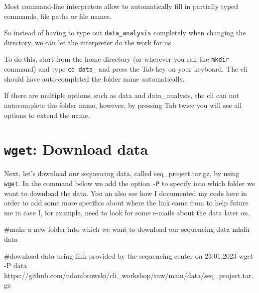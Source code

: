 \documentclass[
  letterpaper,
  DIV=11,
  numbers=noendperiod]{scrreprt}
\newenvironment{Shaded}{}{}
\newcommand{\AttributeTok}[1]{\textcolor[rgb]{0.84,0.23,0.29}{#1}}
\newcommand{\CommentTok}[1]{\textcolor[rgb]{0.42,0.45,0.49}{#1}}
\newcommand{\FunctionTok}[1]{\textcolor[rgb]{0.44,0.26,0.76}{#1}}
\newcommand{\NormalTok}[1]{\textcolor[rgb]{0.14,0.16,0.18}{#1}}
\begin{document}
\begin{tcolorbox}[enhanced jigsaw, colframe=quarto-callout-tip-color-frame, colbacktitle=quarto-callout-tip-color!10!white, opacitybacktitle=0.6, breakable, titlerule=0mm, colback=white, toptitle=1mm, leftrule=.75mm, opacityback=0, coltitle=black, left=2mm, toprule=.15mm, bottomtitle=1mm, rightrule=.15mm, title=\textcolor{quarto-callout-tip-color}{\faLightbulb}\hspace{0.5em}{Tip: Command-line completion}, bottomrule=.15mm, arc=.35mm]

Most command-line interpreters allow to automatically fill in partially
typed commands, file paths or file names.

So instead of having to type out \texttt{data\_analysis} completely when
changing the directory, we can let the interpreter do the work for us.

To do this, start from the home directory (or wherever you ran the
\texttt{mkdir} command) and type \texttt{cd\ data\_} and press the
Tab-key on your keyboard. The cli should have auto-completed the folder
name automatically.

If there are multiple options, such as data and data\_analysis, the cli
can not autocomplete the folder name, however, by pressing Tab twice you
will see all options to extend the name.

\end{tcolorbox}

\section{\texorpdfstring{\texttt{wget}: Download
data}{wget: Download data}}\label{wget-download-data}

Next, let's download our sequencing data, called seq\_project.tar.gz, by
using \texttt{wget}. In the command below we add the option \texttt{-P}
to specify into which folder we want to download the data. You an also
see how I documented my code here in order to add some more specifics
about where the link came from to help future me in case I, for example,
need to look for some e-mails about the data later on.

\begin{Shaded}
\begin{Highlighting}[]
\CommentTok{\#make a new folder into which we want to download our sequencing data}
\FunctionTok{mkdir}\NormalTok{ data}

\CommentTok{\#download data using link provided by the sequencing center on 23.01.2023}
\FunctionTok{wget} \AttributeTok{{-}P}\NormalTok{ data https://github.com/ndombrowski/cli\_workshop/raw/main/data/seq\_project.tar.gz}
\end{Highlighting}
\end{Shaded}
\end{document}

